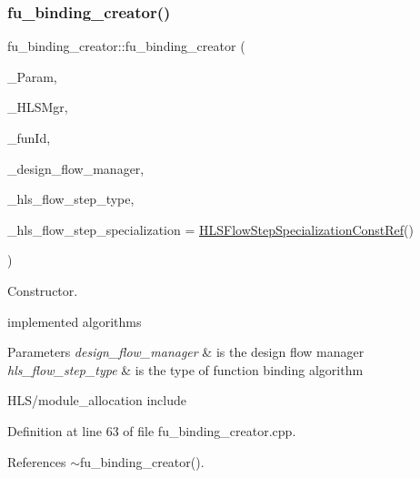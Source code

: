 \subsubsection{\texorpdfstring{fu\+\_\+binding\+\_\+creator()}{fu\_binding\_creator()}}
{\footnotesize\ttfamily fu\+\_\+binding\+\_\+creator\+::fu\+\_\+binding\+\_\+creator (\begin{DoxyParamCaption}\item[{const \hyperlink{Parameter_8hpp_a37841774a6fcb479b597fdf8955eb4ea}{Parameter\+Const\+Ref}}]{\+\_\+\+Param,  }\item[{const \hyperlink{hls__manager_8hpp_acd3842b8589fe52c08fc0b2fcc813bfe}{H\+L\+S\+\_\+manager\+Ref}}]{\+\_\+\+H\+L\+S\+Mgr,  }\item[{unsigned int}]{\+\_\+fun\+Id,  }\item[{const Design\+Flow\+Manager\+Const\+Ref}]{\+\_\+design\+\_\+flow\+\_\+manager,  }\item[{const \hyperlink{hls__step_8hpp_ada16bc22905016180e26fc7e39537f8d}{H\+L\+S\+Flow\+Step\+\_\+\+Type}}]{\+\_\+hls\+\_\+flow\+\_\+step\+\_\+type,  }\item[{const \hyperlink{hls__step_8hpp_a5fdd2edf290c196531d21d68e13f0e74}{H\+L\+S\+Flow\+Step\+Specialization\+Const\+Ref}}]{\+\_\+hls\+\_\+flow\+\_\+step\+\_\+specialization = {\ttfamily \hyperlink{hls__step_8hpp_a5fdd2edf290c196531d21d68e13f0e74}{H\+L\+S\+Flow\+Step\+Specialization\+Const\+Ref}()} }\end{DoxyParamCaption})}



Constructor. 

implemented algorithms


\begin{DoxyParams}{Parameters}
{\em design\+\_\+flow\+\_\+manager} & is the design flow manager \\
\hline
{\em hls\+\_\+flow\+\_\+step\+\_\+type} & is the type of function binding algorithm\\
\hline
\end{DoxyParams}
H\+L\+S/module\+\_\+allocation include 

Definition at line 63 of file fu\+\_\+binding\+\_\+creator.\+cpp.



References $\sim$fu\+\_\+binding\+\_\+creator().

